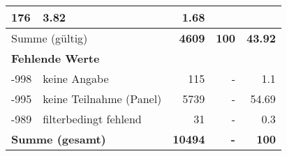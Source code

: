\begin{longtable}{lXrrr}
       \num{176} &
       \num[round-mode=places,round-precision=2]{3.82} &
         \num[round-mode=places,round-precision=2]{1.68} \\
     \midrule
     \multicolumn{2}{l}{Summe (gültig)} &
       \textbf{\num{4609}} &
     \textbf{\num{100}} &
       \textbf{\num[round-mode=places,round-precision=2]{43.92}} \\
     \multicolumn{5}{l}{\textbf{Fehlende Werte}}\\
       -998 &
       keine Angabe &
         \num{115} &
        - &
         \num[round-mode=places,round-precision=2]{1.1} \\
       -995 &
       keine Teilnahme (Panel) &
         \num{5739} &
        - &
         \num[round-mode=places,round-precision=2]{54.69} \\
       -989 &
       filterbedingt fehlend &
         \num{31} &
        - &
         \num[round-mode=places,round-precision=2]{0.3} \\
     \midrule
     \multicolumn{2}{l}{\textbf{Summe (gesamt)}} &
          \textbf{\num{10494}} &
        \textbf{-} &
        \textbf{\num{100}} \\
     \bottomrule
     \end{longtable}
     
